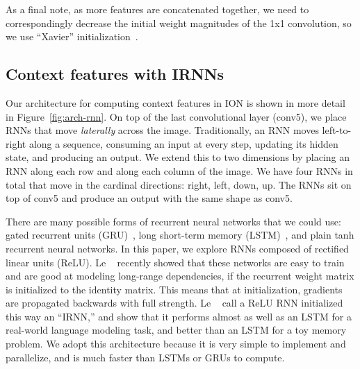 \documentclass[10pt,twocolumn,letterpaper]{article}
\begin{document}

As a final note, as more features are concatenated together, we need to
correspondingly decrease the initial weight magnitudes of the 1x1 convolution,
so we use ``Xavier'' initialization~\cite{glorot10}.

\subsection{Context features with IRNNs}

Our architecture for computing context features in ION is shown in more detail in
Figure~\ref{fig:arch-rnn}.  On top of the last convolutional layer (conv5),
we place RNNs that move \emph{laterally} across the image.  Traditionally, an
RNN moves left-to-right along a sequence, consuming an input at every step,
updating its hidden state, and producing an output.  We extend this to two
dimensions by placing an RNN along each row and along each column of the
image.  We have four RNNs in total that move in the cardinal directions: right,
left, down, up.  The RNNs sit on top of conv5 and produce an output with the
same shape as conv5.

There are many possible forms of recurrent neural networks that we could use:
gated recurrent units (GRU)~\cite{gru}, long short-term memory
(LSTM)~\cite{lstm}, and plain tanh recurrent neural networks.  In this paper, we
explore RNNs composed of rectified linear units (ReLU).  Le \etal~\cite{irnn} recently
showed that these networks are easy to train and are good at modeling long-range
dependencies, if the recurrent weight matrix is initialized to the identity
matrix.  This means that at initialization, gradients are propagated backwards
with full strength.
Le \etal~\cite{irnn} call a ReLU RNN initialized this way an ``IRNN,'' and show
that it performs almost as well as an LSTM for a real-world language modeling
task, and better than an LSTM for a toy memory problem.  We adopt this
architecture because it is very simple to implement and parallelize, and is much
faster than LSTMs or GRUs to compute.
\end{document}
